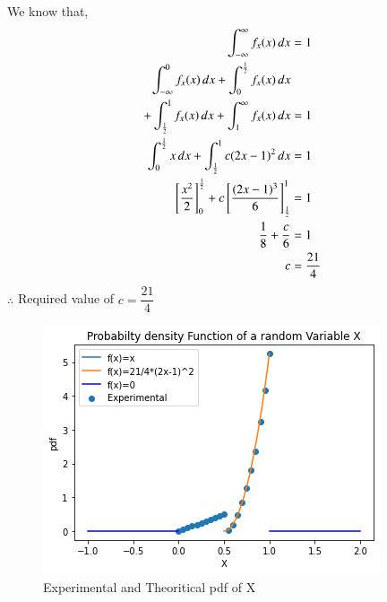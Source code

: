 We know that,
\begin{align}
\int_{-\infty}^{\infty}{f_x(x)}\,dx &= 1\\
    \int_{-\infty}^{0}{f_x(x)}\,dx +\int_{0}^{\frac{1}{2}}{f_x(x)}\,dx&\nonumber\\ +\int_{\frac{1}{2}}^{1}{f_x(x)}\,dx +\int_{1}^{\infty}{f_x(x)}\,dx&=1\\
    \int_{0}^{\frac{1}{2}}x\,dx+\int_{\frac{1}{2}}^{1}c(2x-1)^2\,dx&=1\\
    {}\left[\dfrac{x^2}{2}\right]_0^\frac{1}{2}+c {}\left[\dfrac{(2x-1)^3}{6}\right]_\frac{1}{2}^1&=1\\
    \dfrac{1}{8}+\dfrac{c}{6}&=1\\
    c&=\dfrac{21}{4}
\end{align}
\hspace{2cm}$\therefore$ Required value of $c=\dfrac{21}{4}$

\begin{figure}[h]
   \includegraphics[width=\linewidth]{solutions/adv/ma/2016/10/figures/plot.png}
    \caption{Experimental and Theoritical pdf of X}
    \label{fig:my_label}
\end{figure}



